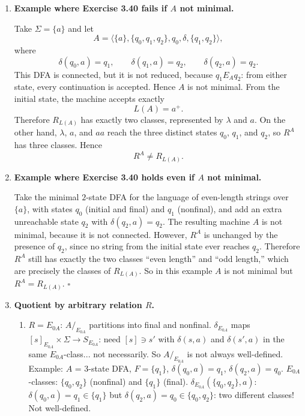 \begin{enumerate}[{3.}1.]
\item \textbf{Example where Exercise 3.40 fails if $A$ not minimal.}

Take $\Sigma=\{a\}$ and let
\[
A=\langle \{a\},\{q_0,q_1,q_2\},q_0,\delta,\{q_1,q_2\}\rangle,
\]
where
\[
\delta(q_0,a)=q_1,\qquad \delta(q_1,a)=q_2,\qquad \delta(q_2,a)=q_2.
\]
This DFA is connected, but it is not reduced, because $q_1 E_A q_2$: from
either state, every continuation is accepted. Hence $A$ is not minimal. From
the initial state, the machine accepts exactly
\[
L(A)=a^+.
\]
Therefore $R_{L(A)}$ has exactly two classes, represented by $\lambda$ and $a$.
On the other hand, $\lambda$, $a$, and $aa$ reach the three distinct states
$q_0$, $q_1$, and $q_2$, so $R^A$ has three classes. Hence
\[
R^A\neq R_{L(A)}.
\]

\item \textbf{Example where Exercise 3.40 holds even if $A$ not minimal.}

Take the minimal $2$-state DFA for the language of even-length strings over
$\{a\}$, with states $q_0$ (initial and final) and $q_1$ (nonfinal), and add an
extra unreachable state $q_2$ with $\delta(q_2,a)=q_2$. The resulting machine
$A$ is not minimal, because it is not connected. However, $R^A$ is unchanged by
the presence of $q_2$, since no string from the initial state ever reaches
$q_2$. Therefore $R^A$ still has exactly the two classes ``even length'' and
``odd length,'' which are precisely the classes of $R_{L(A)}$. So in this
example $A$ is not minimal but $R^A=R_{L(A)}$. $\square$

\item \textbf{Quotient by arbitrary relation $R$.}

\begin{enumerate}
\item $R=E_{0A}$: $A/_{E_{0A}}$ partitions into final and nonfinal. $\delta_{E_{0A}}$ maps $[s]_{E_{0A}}\times\Sigma\to S_{E_{0A}}$: need $[s]\ni s'$ with $\delta(s,a)$ and $\delta(s',a)$ in the same $E_{0A}$-class... not necessarily. So $A/_{E_{0A}}$ is not always well-defined. Example: $A$ = 3-state DFA, $F=\{q_1\}$, $\delta(q_0,a)=q_1$, $\delta(q_2,a)=q_0$. $E_{0A}$-classes: $\{q_0,q_2\}$ (nonfinal) and $\{q_1\}$ (final). $\delta_{E_{0A}}(\{q_0,q_2\},a)$: $\delta(q_0,a)=q_1\in\{q_1\}$ but $\delta(q_2,a)=q_0\in\{q_0,q_2\}$: two different classes! Not well-defined.


\end{enumerate}
\end{enumerate}
